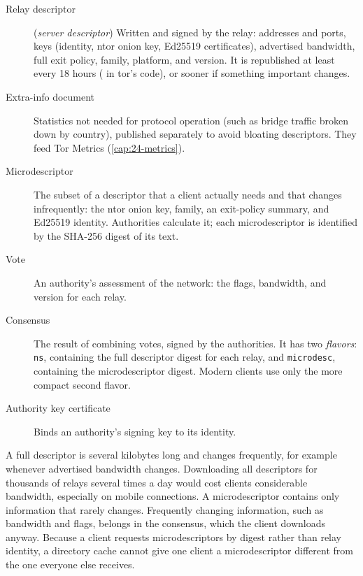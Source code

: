 \begin{description}
  \item[Relay descriptor] (\emph{server descriptor}) Written and signed by the relay: addresses and ports, keys (identity, ntor onion key, Ed25519 certificates), advertised bandwidth, full exit policy, family, platform, and version. It is republished at least every 18 hours ( in tor's code), or sooner if something important changes.
  \item[Extra-info document] Statistics not needed for protocol operation (such as bridge traffic broken down by country), published separately to avoid bloating descriptors. They feed Tor Metrics (\cref{cap:24-metrics}).
  \item[Microdescriptor] The subset of a descriptor that a client actually needs and that changes infrequently: the ntor onion key, family, an exit-policy summary, and Ed25519 identity. Authorities calculate it; each microdescriptor is identified by the SHA-256 digest of its text.
  \item[Vote] An authority's assessment of the network: the flags, bandwidth, and version for each relay.
  \item[Consensus] The result of combining votes, signed by the authorities. It has two \emph{flavors}: \texttt{ns}, containing the full descriptor digest for each relay, and \texttt{microdesc}, containing the microdescriptor digest. Modern clients use only the more compact second flavor.
  \item[Authority key certificate] Binds an authority's signing key to its identity.
\end{description}

\begin{approfondimento}
A full descriptor is several kilobytes long and changes frequently, for example whenever advertised bandwidth changes. Downloading all descriptors for thousands of relays several times a day would cost clients considerable bandwidth, especially on mobile connections. A microdescriptor contains only information that rarely changes. Frequently changing information, such as bandwidth and flags, belongs in the consensus, which the client downloads anyway. Because a client requests microdescriptors by digest rather than relay identity, a directory cache cannot give one client a microdescriptor different from the one everyone else receives.
\end{approfondimento}

